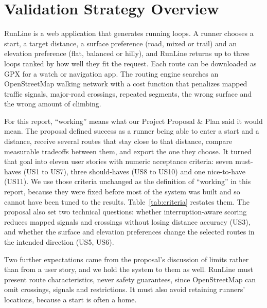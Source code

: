 \section{Validation Strategy Overview}

RunLine is a web application that generates running loops. A runner chooses a
start, a target distance, a surface preference (road, mixed or trail) and an
elevation preference (flat, balanced or hilly), and RunLine returns up to three
loops ranked by how well they fit the request. Each route can be downloaded as
GPX for a watch or navigation app. The routing engine searches an
OpenStreetMap walking network \citep{boeing2017osmnx,hagberg2008networkx} with
a cost function that penalizes mapped traffic signals, major-road crossings,
repeated segments, the wrong surface and the wrong amount of climbing.

For this report, ``working'' means what our Project Proposal \& Plan
\citep{runguys2026proposal} said it would mean. The proposal defined success as a
runner being able to enter a start and a distance, receive several routes that
stay close to that distance, compare measurable tradeoffs between them, and
export the one they choose. It turned that goal into eleven user stories with
numeric acceptance criteria: seven must-haves (US1 to US7), three
should-haves (US8 to US10) and one nice-to-have (US11). We use those criteria
unchanged as the definition of ``working'' in this report, because they were
fixed before most of the system was built and so cannot have been tuned to
the results. Table~\ref{tab:criteria} restates them. The proposal also set two
technical questions: whether interruption-aware scoring reduces mapped
signals and crossings without losing distance accuracy (US3), and whether the
surface and elevation preferences change the selected routes in the intended
direction (US5, US6).

Two further expectations came from the proposal's discussion of limits rather
than from a user story, and we hold the system to them as well. RunLine must
present route characteristics, never safety guarantees, since OpenStreetMap
can omit crossings, signals and restrictions. It must also avoid retaining
runners' locations, because a start is often a home.

